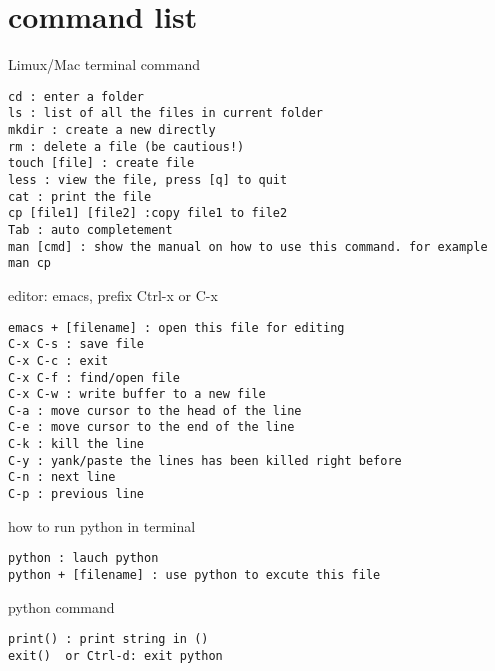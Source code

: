 \documentclass[aps,prb,12pt,tightenlines,%
notitlepage,longbibliography]{revtex4-1}
\begin{document}
\section{command list}
Limux/Mac terminal command
\begin{verbatim}
cd : enter a folder
ls : list of all the files in current folder
mkdir : create a new directly
rm : delete a file (be cautious!)
touch [file] : create file
less : view the file, press [q] to quit
cat : print the file
cp [file1] [file2] :copy file1 to file2
Tab : auto completement
man [cmd] : show the manual on how to use this command. for example
man cp
\end{verbatim}
editor: emacs, prefix Ctrl-x  or C-x

\begin{verbatim}
emacs + [filename] : open this file for editing
C-x C-s : save file
C-x C-c : exit
C-x C-f : find/open file
C-x C-w : write buffer to a new file
C-a : move cursor to the head of the line
C-e : move cursor to the end of the line
C-k : kill the line
C-y : yank/paste the lines has been killed right before
C-n : next line
C-p : previous line
\end{verbatim}

how to run python in terminal
\begin{verbatim}
python : lauch python
python + [filename] : use python to excute this file
\end{verbatim}

python command
\begin{verbatim}
print() : print string in ()
exit()  or Ctrl-d: exit python
\end{verbatim}



\end{document}
